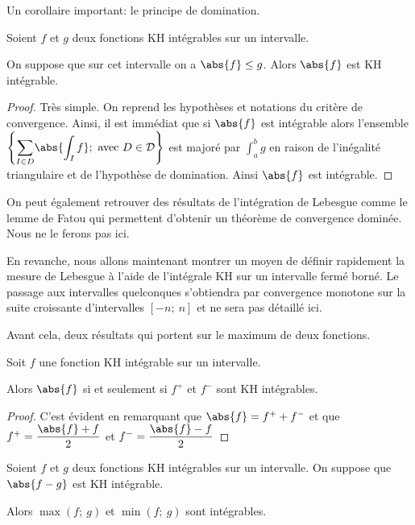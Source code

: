 Un corollaire important: le principe de domination.

\begin{cor}[Domination]
Soient $f$ et $g$ deux fonctions KH intégrables sur un intervalle. 

On suppose que sur cet intervalle on a $\abs{f} \leq g$. Alors $\abs{f}$ est KH intégrable.
\end{cor}

\begin{proof}
Très simple. On reprend les hypothèses et notations du critère de convergence. Ainsi, il est immédiat que si $\abs{f}$ est intégrable alors l'ensemble $\left \{ \displaystyle{\sum \limits_{I \in D}} \abs{\int_I f}; \text{ avec }D  \in \mathcal{D}\right \}$ est majoré par $\int_a^b g$ en raison de l'inégalité triangulaire et de l'hypothèse de domination. Ainsi $\abs{f}$ est intégrable.
\end{proof}

On peut également retrouver des résultats de l'intégration de Lebesgue comme le lemme de Fatou qui permettent d'obtenir un théorème de convergence dominée. Nous ne le ferons pas ici. 

En revanche, nous allons maintenant montrer un moyen de définir rapidement la mesure de Lebesgue à l'aide de l'intégrale KH sur un intervalle fermé borné. Le passage aux intervalles quelconques s'obtiendra par convergence monotone sur la suite croissante d'intervalles $[-n;~n]$ et ne sera pas détaillé ici.

Avant cela, deux résultats qui portent sur le maximum de deux fonctions.

\begin{lem}[Intégrabilité de $f^+$ et $f^-$]
Soit $f$ une fonction KH intégrable sur un intervalle. 

Alors $\abs{f}$ si et seulement si $f^+$ et $f^-$ sont KH intégrables.
\end{lem}

\begin{proof}
C'est évident en remarquant que $\abs{f} = f^++f^-$ et que $f^+ = \dfrac{\abs{f}+f}{2}$ et $f^- = \dfrac{\abs{f}-f}{2}$
\end{proof}

\begin{prop}
Soient $f$ et $g$ deux fonctions KH intégrables sur un intervalle. On suppose que $\abs{f-g}$ est KH intégrable.

Alors $\max(f;~g)$ et $\min(f;~g)$ sont intégrables.
\end{prop}


